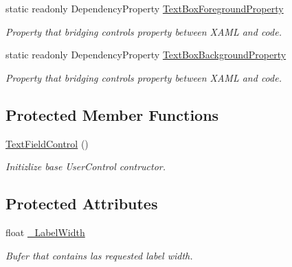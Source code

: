 \begin{DoxyCompactItemize}
static readonly Dependency\+Property \mbox{\hyperlink{class_wpf_handler_1_1_u_i_1_1_controls_1_1_text_field_control_aef80cc7a4cde41c24e8a599a5702956c}{Text\+Box\+Foreground\+Property}}
\begin{DoxyCompactList}\small\item\em Property that bridging control\textquotesingle{}s property between X\+A\+ML and code. \end{DoxyCompactList}\item 
static readonly Dependency\+Property \mbox{\hyperlink{class_wpf_handler_1_1_u_i_1_1_controls_1_1_text_field_control_ab49579689a93b206513268c77d6343c7}{Text\+Box\+Background\+Property}}
\begin{DoxyCompactList}\small\item\em Property that bridging control\textquotesingle{}s property between X\+A\+ML and code. \end{DoxyCompactList}\end{DoxyCompactItemize}
\subsection*{Protected Member Functions}
\begin{DoxyCompactItemize}
\item 
\mbox{\hyperlink{class_wpf_handler_1_1_u_i_1_1_controls_1_1_text_field_control_a90ff02e9ee1b2b63d034a3376594ddf4}{Text\+Field\+Control}} ()
\begin{DoxyCompactList}\small\item\em Initizlize base User\+Control contructor. \end{DoxyCompactList}\end{DoxyCompactItemize}
\subsection*{Protected Attributes}
\begin{DoxyCompactItemize}
\item 
float \mbox{\hyperlink{class_wpf_handler_1_1_u_i_1_1_controls_1_1_text_field_control_ab30d14bb8af0855cdadbc2c2713273ad}{\+\_\+\+Label\+Width}}
\begin{DoxyCompactList}\small\item\em Bufer that contains las requested label width. \end{DoxyCompactList}\end{DoxyCompactItemize}
